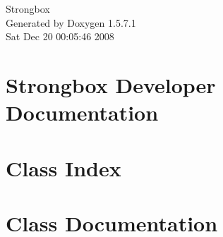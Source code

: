 \documentclass[a4paper]{book}
\begin{document}
\begin{titlepage}
\vspace*{7cm}
\begin{center}
{\Large Strongbox }\\
\vspace*{1cm}
{\large Generated by Doxygen 1.5.7.1}\\
\vspace*{0.5cm}
{\small Sat Dec 20 00:05:46 2008}\\
\end{center}
\end{titlepage}
\clearemptydoublepage
{}
\tableofcontents
\clearemptydoublepage
{}
\chapter{Strongbox Developer Documentation}
\label{index}\hypertarget{index}{}
\chapter{Class Index}

\chapter{Class Documentation}

















\printindex
\end{document}
